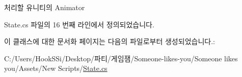 처리할 유니티의 Animator 



State.\+cs 파일의 16 번째 라인에서 정의되었습니다.


\begin{DoxyCode}{0}

\end{DoxyCode}


이 클래스에 대한 문서화 페이지는 다음의 파일로부터 생성되었습니다.\+:\begin{DoxyCompactItemize}
\item 
C\+:/\+Users/\+Hook\+S\+Si/\+Desktop/파티/게임잼/\+Someone-\/likes-\/you/\+Someone likes you/\+Assets/\+New Scripts/\mbox{\hyperlink{_state_8cs}{State.\+cs}}\end{DoxyCompactItemize}
